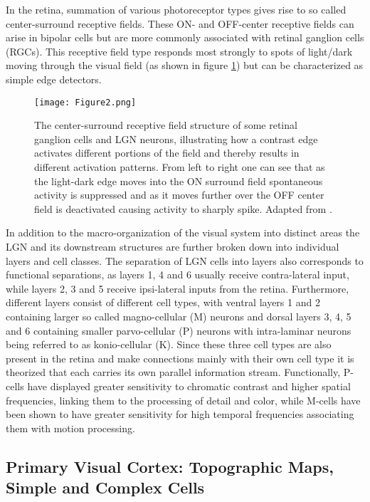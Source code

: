 In the retina, summation of various photoreceptor types gives rise to
so called center-surround receptive fields. These ON- and OFF-center
receptive fields can arise in bipolar cells but are more commonly
associated with retinal ganglion cells (RGCs). This receptive field
type responds most strongly to spots of light/dark moving through the
visual field (as shown in figure \ref{Center-Surround}) but can be
characterized as simple edge detectors.

\begin{figure}
	\centering \texttt{[image: Figure2.png]}
	\caption[A Center-surround receptive field. Adapted from
      \cite{Bear2006}.]{The center-surround receptive field structure
      of some retinal ganglion cells and LGN neurons, illustrating how
      a contrast edge activates different portions of the field and
      thereby results in different activation patterns. From left to
      right one can see that as the light-dark edge moves into the ON
      surround field spontaneous activity is suppressed and as it
      moves further over the OFF center field is deactivated causing
      activity to sharply spike. Adapted from \cite{Bear2006}.}
	\label{Center-Surround}
\end{figure}

In addition to the macro-organization of the visual system into
distinct areas the LGN and its downstream structures are further
broken down into individual layers and cell classes. The separation of
LGN cells into layers also corresponds to functional separations, as
layers 1, 4 and 6 usually receive contra-lateral input, while layers
2, 3 and 5 receive ipsi-lateral inputs from the retina. Furthermore,
different layers consist of different cell types, with ventral layers
1 and 2 containing larger so called magno-cellular (M) neurons and
dorsal layers 3, 4, 5 and 6 containing smaller parvo-cellular (P)
neurons with intra-laminar neurons being referred to as konio-cellular
(K). Since these three cell types are also present in the retina and
make connections mainly with their own cell type it is theorized that
each carries its own parallel information stream. Functionally,
P-cells have displayed greater sensitivity to chromatic contrast and
higher spatial frequencies, linking them to the processing of detail
and color, while M-cells have been shown to have greater sensitivity
for high temporal frequencies associating them with motion processing.

\subsection{Primary Visual Cortex: Topographic Maps, Simple and Complex Cells}

